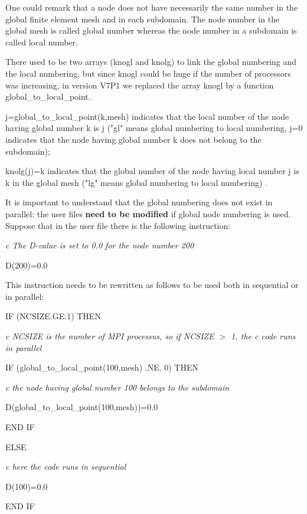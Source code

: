  One could remark that a node does not have necessarily the same number in the global finite element mesh and in each subdomain. The node number in the global mesh is called global number whereas the node number in a subdomain is called local number.

 There used to be two arrays (knogl and knolg) to link the global numbering and the local numbering, but since knogl could be huge if the number of processors was increasing, in version V7P1 we replaced the array knogl by a function global\_to\_local\_point.

 j=global\_to\_local\_point(k,mesh) indicates that the local number of the node having global number k is j ("gl" means global numbering to local numbering, j=0 indicates that the node having global number k does not belong to the subdomain);

 knolg(j)=k indicates that the global number of the node having local number j is k in the global mesh ("lg" means global numbering to local numbering) .



 It is important to understand that the global numbering does not exist in parallel: the user files \textbf{need to be modified} if global node numbering is used. Suppose that in the user file there is the following instruction:



 \textit{c The D-value  is set to 0.0 for  the node number 200}

 D(200)=0.0



 This instruction needs to be rewritten as follows to be used both in sequential or in parallel:



 IF (NCSIZE.GE.1) THEN

 \textit{c NCSIZE is the number of MPI processus, so if NCSIZE $>$ 1, the c code runs in parallel}

 IF (global\_to\_local\_point(100,mesh) .NE. 0) THEN

 \textit{c the node having global number 100 belongs to the subdomain}

  D(global\_to\_local\_point(100,mesh))=0.0

  END IF

 ELSE

 \textit{c here the code runs in sequential }

 D(100)=0.0

 END IF

